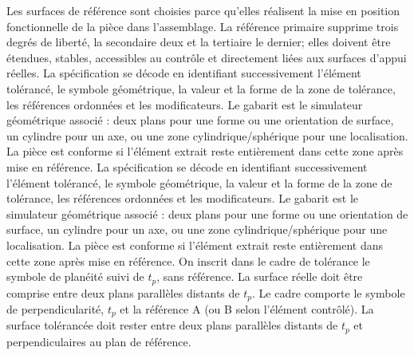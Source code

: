\begin{corrigebox}
Les surfaces de référence sont choisies parce qu'elles
                réalisent la mise en position fonctionnelle de la pièce dans l'assemblage.
                La référence primaire supprime trois degrés de liberté, la secondaire deux
                et la tertiaire le dernier; elles doivent être étendues, stables,
                accessibles au contrôle et directement liées aux surfaces d'appui réelles.
La spécification se décode en identifiant successivement
                l'élément tolérancé, le symbole géométrique, la valeur et la forme de la
                zone de tolérance, les références ordonnées et les modificateurs. Le
                gabarit est le simulateur géométrique associé : deux plans pour une forme
                ou une orientation de surface, un cylindre pour un axe, ou une zone
                cylindrique/sphérique pour une localisation. La pièce est conforme si
                l'élément extrait reste entièrement dans cette zone après mise en référence.
La spécification se décode en identifiant successivement
                l'élément tolérancé, le symbole géométrique, la valeur et la forme de la
                zone de tolérance, les références ordonnées et les modificateurs. Le
                gabarit est le simulateur géométrique associé : deux plans pour une forme
                ou une orientation de surface, un cylindre pour un axe, ou une zone
                cylindrique/sphérique pour une localisation. La pièce est conforme si
                l'élément extrait reste entièrement dans cette zone après mise en référence.
On inscrit dans le cadre de tolérance le symbole de
                planéité suivi de $t_p$, sans référence. La surface réelle doit être
                comprise entre deux plans parallèles distants de $t_p$.
Le cadre comporte le symbole de perpendicularité,
                $t_p$ et la référence A (ou B selon l'élément contrôlé). La surface
                tolérancée doit rester entre deux plans parallèles distants de $t_p$ et
                perpendiculaires au plan de référence.
\end{corrigebox}
